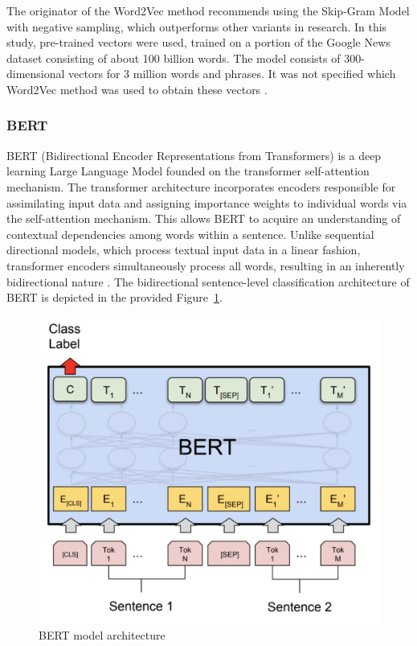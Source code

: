 The originator of the Word2Vec method recommends using the Skip-Gram Model with negative sampling, which outperforms other variants in research. In this study, pre-trained vectors were used, trained on a portion of the Google News dataset consisting of about 100 billion words. The model consists of 300-dimensional vectors for 3 million words and phrases. It was not specified which Word2Vec method was used to obtain these vectors \autocite{Mikolov2013}.

\subsubsection{BERT}
BERT (Bidirectional Encoder Representations from Transformers) is a deep learning Large Language Model founded on the transformer self-attention mechanism. The transformer architecture incorporates encoders responsible for assimilating input data and assigning importance weights to individual words via the self-attention mechanism. This allows BERT to acquire an understanding of contextual dependencies among words within a sentence. Unlike sequential directional models, which process textual input data in a linear fashion, transformer encoders simultaneously process all words, resulting in an inherently bidirectional nature \autocite{Vaswani2017}. The bidirectional sentence-level classification architecture of BERT is depicted in the provided Figure~\ref{bert_architecture}.

\begin{figure}[hbt!]
\centering
\includegraphics[width=0.8\linewidth]{bert_architecture.png}
\caption{BERT model architecture \autocite{Devlin2018}}
\label{bert_architecture}
\end{figure}

